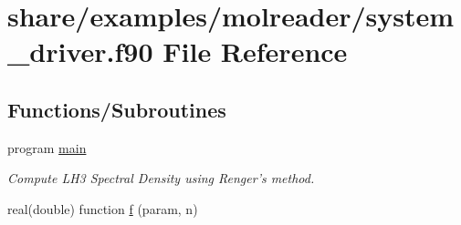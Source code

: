 \hypertarget{share_2examples_2molreader_2system__driver_8f90}{\section{share/examples/molreader/system\+\_\+driver.f90 File Reference}
\label{share_2examples_2molreader_2system__driver_8f90}
}
\subsection*{Functions/\+Subroutines}
\begin{DoxyCompactItemize}
\item 
program \hyperlink{share_2examples_2molreader_2system__driver_8f90_a8ec2266d83cd6c0b762cbcbc92c0af3d}{main}
\begin{DoxyCompactList}\small\item\em Compute L\+H3 Spectral Density using Renger's method. \end{DoxyCompactList}\item 
real(double) function \hyperlink{share_2examples_2molreader_2system__driver_8f90_aa2135d8f316dac80d3d2ba872771b95b}{f} (param, n)
\end{DoxyCompactItemize}



